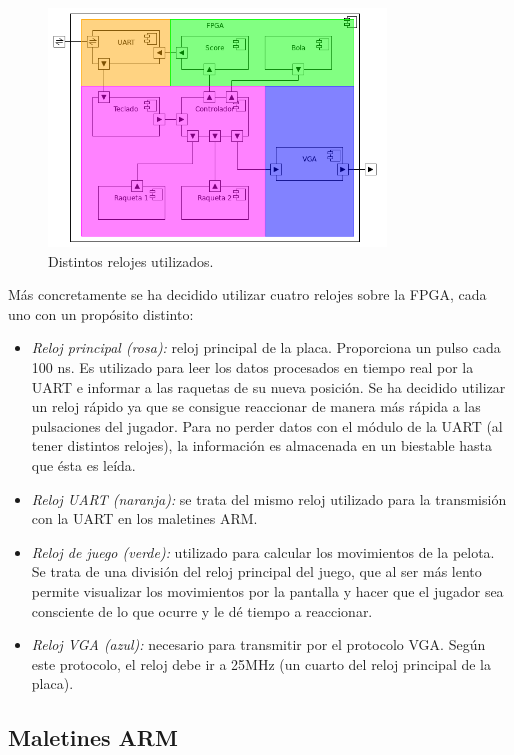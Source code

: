 \begin{figure}[h]
  \centering
  \includegraphics[width=0.8\textwidth]{images/fpga_componentes_timing_v2.png}
  \caption{Distintos relojes utilizados.}
  \label{s3:fig:componentes-fpga-clocking}
\end{figure}


Más concretamente se ha decidido utilizar cuatro relojes sobre la FPGA,
cada uno con un propósito distinto:
\begin{itemize}
\item \emph{Reloj principal (rosa):} reloj principal de la
  placa. Proporciona un pulso cada 100 ns. Es utilizado para leer los datos
  procesados en tiempo real por la UART e informar a las raquetas de su
  nueva posición. Se ha decidido utilizar un reloj rápido ya que se
  consigue reaccionar de manera más rápida a las pulsaciones del
  jugador. Para no perder datos con el módulo de la UART (al tener
  distintos relojes), la información es almacenada en un biestable hasta
  que ésta es leída.
\item \emph{Reloj UART (naranja):} se trata del mismo reloj utilizado para
  la transmisión con la UART en los maletines ARM.
\item \emph{Reloj de juego (verde):} utilizado para calcular los
  movimientos de la pelota. Se trata de una división del reloj principal
  del juego, que al ser más lento permite visualizar los movimientos por la
  pantalla y hacer que el jugador sea consciente de lo que ocurre y le dé
  tiempo a reaccionar.
\item \emph{Reloj VGA (azul):} necesario para transmitir por el
  protocolo VGA. Según este protocolo, el reloj debe ir a 25MHz (un cuarto
  del reloj principal de la placa).
\end{itemize}

\subsection{Maletines ARM}
\label{s3:subsec:maletines}

